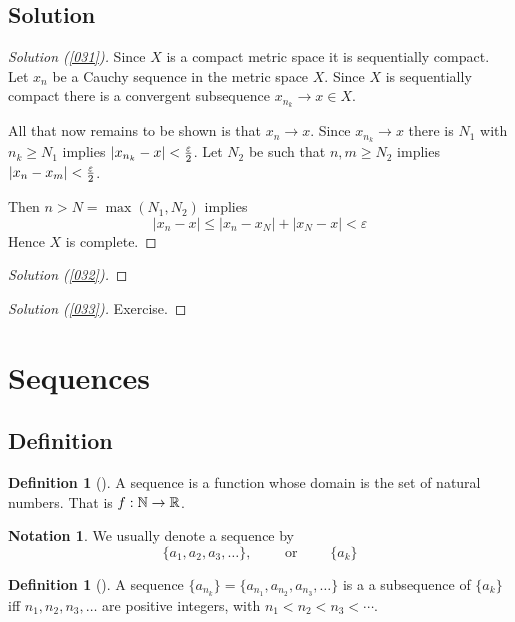 \documentclass[	DIV=calc,paper=a4,fontsize=11pt]{scrartcl}	 	%
\theoremstyle{definition}
\newtheorem{defn}[thm]{Definition}
\newtheorem{notn}[thm]{Notation}
\theoremstyle{plain}
\theoremstyle{remark}
\begin{document}
\newpage
\subsection*{Solution}
\begin{proof}[Solution (\ref{031})]
Since $X$ is a compact metric space it is sequentially compact.\\ Let $x_n$ be a Cauchy sequence in the metric space $X$. Since $X$ is sequentially compact there is a convergent subsequence $x_{n_k}\to x \in X$.

All that now remains to be shown is that $x_n \to x$. Since $x_{n_k}\to x$ there is $N_1$ with $n_k \ge N_1$ implies $|x_{n_k}-x|<{\varepsilon\over 2}$. Let $N_2$ be such that $n,m\ge N_2$ implies $|x_n-x_m|<{\varepsilon \over 2}$.

Then $n>N=\max(N_1,N_2)$ implies
$$ |x_n-x|\le |x_n-x_N|+|x_N-x|<\varepsilon$$
Hence $X$ is complete.
\end{proof}

\begin{proof}[Solution (\ref{032})]
\end{proof}

\begin{proof}[Solution (\ref{033})]
Exercise.
\end{proof}

\newpage
\section{Sequences}

\subsection{Definition}
\begin{defn}[\textbf{\color{blue}{Sequence}}]
A sequence is a function whose domain is the set of natural numbers. That is $f:\Bbb N\rightarrow \Bbb R$.
\end{defn}
\begin{notn}
We usually denote a sequence by
\[\{a_1,a_2,a_3,\ldots\},\qquad \text{ or }\qquad\{a_k\}\]
\end{notn}

\begin{defn}[\textbf{\color{blue}{Subsequence}}]
A sequence $\{a_{n_k}\}=\{a_{n_1},a_{n_2},a_{n_3},\ldots\}$ is a a subsequence of $\{a_k\}$ iff $n_1,n_2,n_3,\ldots$ are positive integers, with  $n_1<n_2<n_3<\cdots$.
\end{defn}
\end{document}
